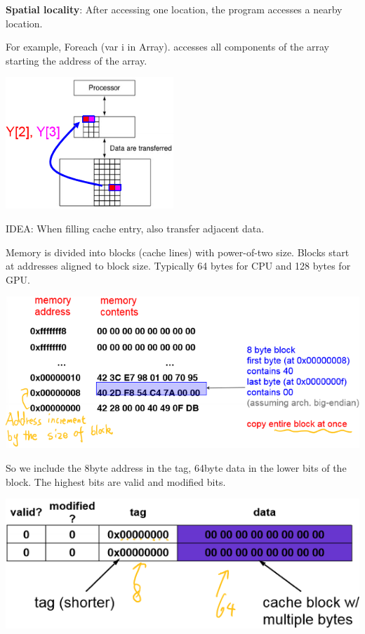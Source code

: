 \documentclass[letterpaper,12pt]{article}
\begin{document}
\textbf{Spatial locality}: After accessing one location, the program accesses a nearby location.

For example, Foreach (var i in Array). accesses all components of the array starting the address of the array.

\includegraphics*{./Image/Spatial locality idea.png}

IDEA: When filling cache entry, also transfer adjacent data.

Memory is divided into blocks (cache lines) with power-of-two size. Blocks start at addresses aligned to block size. Typically 64 bytes for CPU and 128 bytes for GPU.

\includegraphics*{./Image/Memory block illustration.png}

So we include the 8\-byte address in the tag, 64\-byte data in the lower bits of the block. The highest bits are valid and modified bits.

\includegraphics*{./Image/Cache block design.png}
\end{document}
